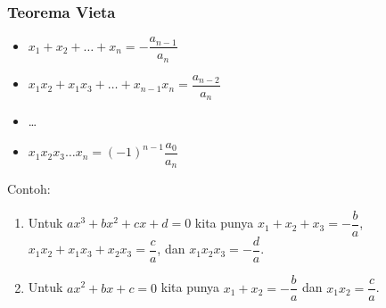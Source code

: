 \subsubsection{Teorema Vieta}
\begin{itemize}
    \item $x_1+x_2+\dots+x_n=-\dfrac{a_{n-1}}{a_n}$
    \item $x_1x_2+x_1x_3+\dots+x_{n-1}x_n=\dfrac{a_{n-2}}{a_n}$
    \item \dots
    \item $x_1x_2x_3\ldots x_n = (-1)^{n-1}\dfrac{a_{0}}{a_n}$
\end{itemize}

Contoh:
\begin{enumerate}
\item Untuk $ax^3+bx^2+cx+d=0$ kita punya $x_1+x_2+x_3=-\dfrac{b}{a}$, $x_1x_2+x_1x_3+x_2x_3=\dfrac{c}{a}$, dan $x_1x_2x_3=-\dfrac{d}{a}$.
\item Untuk $ax^2+bx+c=0$ kita punya $x_1+x_2=-\dfrac{b}{a}$ dan $x_1x_2=\dfrac{c}{a}$.
\end{enumerate}